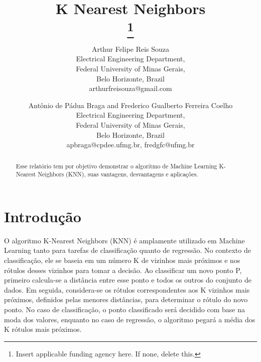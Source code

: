 \documentclass{article} %
\begin{document}
\title{K Nearest Neighbors\\
\thanks{Insert applicable funding agency here. If none, delete this.}
}

\author{Arthur Felipe Reis Souza \\
Electrical Engineering Department, \\
Federal University of Minas Gerais, \\
Belo Horizonte, Brazil \\
arthurfreisouza@gmail.com \\
\and
Antônio de Pádua Braga and Frederico Gualberto Ferreira Coelho \\
Electrical Engineering Department, \\
Federal University of Minas Gerais, \\
Belo Horizonte, Brazil \\
apbraga@cpdee.ufmg.br, fredgfc@ufmg.br
}

\maketitle

\begin{abstract}

    Esse relatório tem por objetivo demonstrar o algoritmo de Machine Learning K-Nearest Neighbors (KNN), suas vantagens, desvantagens e aplicações.

\end{abstract}

\section{Introdução}

O algoritmo K-Nearest Neighbors (KNN) é amplamente utilizado em Machine Learning tanto para tarefas de classificação quanto de regressão. No contexto de classificação, ele se baseia em um número K de vizinhos mais próximos e nos rótulos desses vizinhos para tomar a decisão. Ao classificar um novo ponto P, primeiro calcula-se a distância entre esse ponto e todos os outros do conjunto de dados. Em seguida, considera-se os rótulos correspondentes aos K vizinhos mais próximos, definidos pelas menores distâncias, para determinar o rótulo do novo ponto. No caso de classificação, o ponto classificado será decidido com base na moda dos valores, enquanto no caso de regressão, o algoritmo pegará a média dos K rótulos mais próximos.

\vspace{1cm}
\end{document}
